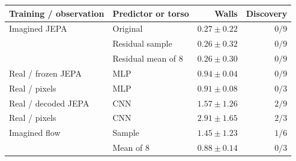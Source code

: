 \begin{tabular}{llrr}
\toprule
\rowcolor{Navy!8}
Training / observation & Predictor or torso & Walls & Discovery \\
\midrule
\rowcolor{JEPA!7}
Imagined JEPA & Original & $0.27\pm0.22$ & $0/9$ \\
 & Residual sample & $0.26\pm0.32$ & $0/9$ \\
\rowcolor{JEPA!7}
 & Residual mean of 8 & $0.26\pm0.30$ & $0/9$ \\
\midrule
\rowcolor{Real!7}
Real / frozen JEPA & MLP & $0.94\pm0.04$ & $0/9$ \\
Real / pixels & MLP & $0.91\pm0.08$ & $0/3$ \\
\rowcolor{Real!7}
Real / decoded JEPA & CNN & $1.57\pm1.26$ & $2/9$ \\
Real / pixels & CNN & $2.91\pm1.65$ & $2/3$ \\
\midrule
\rowcolor{Flow!7}
Imagined flow & Sample & $1.45\pm1.23$ & $1/6$ \\
 & Mean of 8 & $0.88\pm0.14$ & $0/3$ \\
\bottomrule
\end{tabular}
